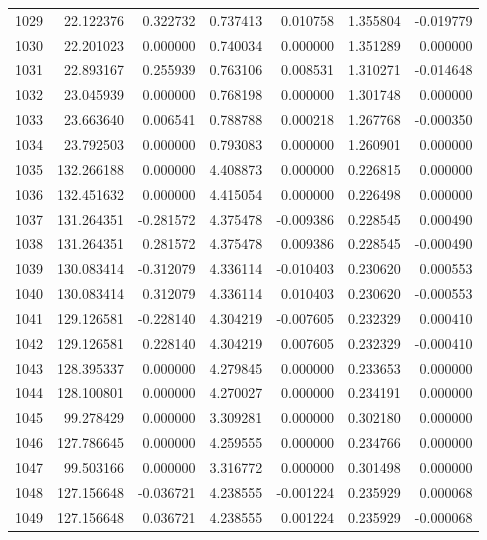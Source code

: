 \begin{tabular}{rrrrrrr}
1029 &  22.122376 &    0.322732 &  0.737413 &   0.010758 &   1.355804 & -0.019779 \\
1030 &  22.201023 &    0.000000 &  0.740034 &   0.000000 &   1.351289 &  0.000000 \\
1031 &  22.893167 &    0.255939 &  0.763106 &   0.008531 &   1.310271 & -0.014648 \\
1032 &  23.045939 &    0.000000 &  0.768198 &   0.000000 &   1.301748 &  0.000000 \\
1033 &  23.663640 &    0.006541 &  0.788788 &   0.000218 &   1.267768 & -0.000350 \\
1034 &  23.792503 &    0.000000 &  0.793083 &   0.000000 &   1.260901 &  0.000000 \\
1035 & 132.266188 &    0.000000 &  4.408873 &   0.000000 &   0.226815 &  0.000000 \\
1036 & 132.451632 &    0.000000 &  4.415054 &   0.000000 &   0.226498 &  0.000000 \\
1037 & 131.264351 &   -0.281572 &  4.375478 &  -0.009386 &   0.228545 &  0.000490 \\
1038 & 131.264351 &    0.281572 &  4.375478 &   0.009386 &   0.228545 & -0.000490 \\
1039 & 130.083414 &   -0.312079 &  4.336114 &  -0.010403 &   0.230620 &  0.000553 \\
1040 & 130.083414 &    0.312079 &  4.336114 &   0.010403 &   0.230620 & -0.000553 \\
1041 & 129.126581 &   -0.228140 &  4.304219 &  -0.007605 &   0.232329 &  0.000410 \\
1042 & 129.126581 &    0.228140 &  4.304219 &   0.007605 &   0.232329 & -0.000410 \\
1043 & 128.395337 &    0.000000 &  4.279845 &   0.000000 &   0.233653 &  0.000000 \\
1044 & 128.100801 &    0.000000 &  4.270027 &   0.000000 &   0.234191 &  0.000000 \\
1045 &  99.278429 &    0.000000 &  3.309281 &   0.000000 &   0.302180 &  0.000000 \\
1046 & 127.786645 &    0.000000 &  4.259555 &   0.000000 &   0.234766 &  0.000000 \\
1047 &  99.503166 &    0.000000 &  3.316772 &   0.000000 &   0.301498 &  0.000000 \\
1048 & 127.156648 &   -0.036721 &  4.238555 &  -0.001224 &   0.235929 &  0.000068 \\
1049 & 127.156648 &    0.036721 &  4.238555 &   0.001224 &   0.235929 & -0.000068 \\

\end{tabular}
